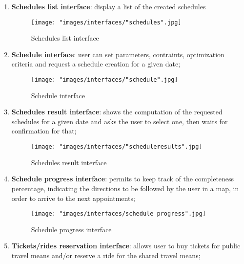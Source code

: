 \begin{enumerate}
\item \textbf{Schedules list interface}: display a list of the created schedules
\begin{figure}[H]
\begin{center}
\texttt{[image: "images/interfaces/"schedules".jpg]}
\caption{Schedules list interface}
\end{center}
\end{figure}

\item \textbf{Schedule interface}: user can set parameters, contraints, optimization criteria and request a schedule creation for a given date;
\begin{figure}[H]
\begin{center}
\texttt{[image: "images/interfaces/"schedule".jpg]}
\caption{Schedule interface}
\end{center}
\end{figure}

\item \textbf{Schedules result interface}: shows the computation of the requested schedules for a given date and asks the user to select one, then waits for confirmation for that;
\begin{figure}[H]
\begin{center}
\texttt{[image: "images/interfaces/"scheduleresults".jpg]}
\caption{Schedules result interface}
\end{center}
\end{figure}

\item \textbf{Schedule progress interface}: permits to keep track of the completeness percentage, indicating the directions to be followed by the user in a map, in order to arrive to the next appointments;
\begin{figure}[H]
\begin{center}
\texttt{[image: "images/interfaces/schedule progress".jpg]}
\caption{Schedule progress interface}
\end{center}
\end{figure}

\item \textbf{Tickets/rides reservation interface}: allows user to buy tickets for public travel means and/or reserve a ride for the shared travel means;
\end{enumerate}

